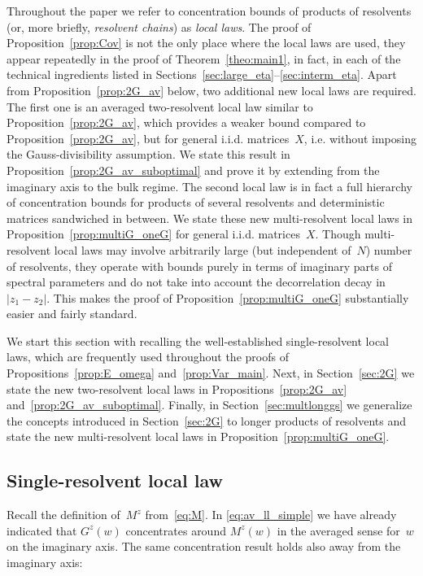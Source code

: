 \documentclass[10pt]{amsart}
\numberwithin{equation}{section}
\begin{document}
Throughout the paper we refer to concentration bounds of products of resolvents (or, more briefly, \emph{resolvent chains}) as \emph{local laws}.  The proof of Proposition~\ref{prop:Cov} is not the only place where the local laws are used, they appear repeatedly in the proof of Theorem~\ref{theo:main1}, in fact, in each of the technical ingredients listed in Sections~\ref{sec:large_eta}--\ref{sec:interm_eta}. Apart from Proposition~\ref{prop:2G_av} below, two additional new local laws are required. The first one is an averaged two-resolvent local law similar to Proposition~\ref{prop:2G_av}, which provides a weaker bound compared to Proposition~\ref{prop:2G_av}, but for general i.i.d. matrices~$X$, i.e. without imposing the Gauss-divisibility assumption. We state this result in Proposition~\ref{prop:2G_av_suboptimal} and prove it by extending \cite[Theorem~3.4]{nonHermdecay} from the imaginary axis to the bulk regime. The second local law is in fact a full hierarchy of concentration bounds for products of several resolvents and deterministic matrices sandwiched in between. We state these new multi-resolvent local laws in Proposition~\ref{prop:multiG_oneG} for general i.i.d. matrices~$X$. Though multi-resolvent local laws may involve arbitrarily large (but independent of~$N$) number of resolvents, they operate with bounds purely in terms of imaginary parts of spectral parameters and do not take into account the decorrelation decay in $|z_1-z_2|$. This makes the proof of Proposition~\ref{prop:multiG_oneG} substantially easier and fairly standard.

We start this section with recalling the well-established single-resolvent local laws, which are frequently used throughout the proofs of Propositions~\ref{prop:E_omega} and~\ref{prop:Var_main}.  Next, in Section~\ref{sec:2G} we state the new two-resolvent local laws in Propositions~\ref{prop:2G_av} and~\ref{prop:2G_av_suboptimal}. Finally, in Section~\ref{sec:multlonggs} we generalize the concepts introduced in Section~\ref{sec:2G} to longer products of resolvents and state the new multi-resolvent local laws in Proposition~\ref{prop:multiG_oneG}.


\subsection{Single-resolvent local law}

Recall the definition of~$M^z$ from~\eqref{eq:M}. In \eqref{eq:av_ll_simple} we have already indicated that $G^z(w)$ concentrates around $M^z(w)$ in the averaged sense for~$w$ on the imaginary axis. The same concentration result holds also away from the imaginary axis:
\end{document}
